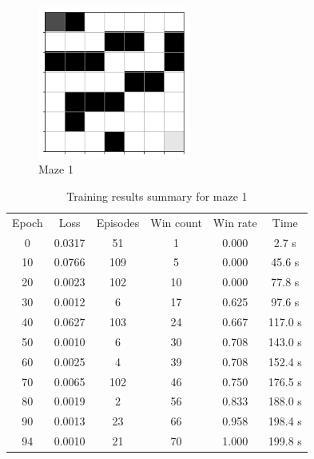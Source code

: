 \documentclass[a4paper]{article}    %
\begin{document}
\begin{figure}[H]
    \centering
    \includegraphics[width=5cm]{maze1-maze}
    \caption{Maze 1}
    \label{fig:maze1}
\end{figure}

\begin{table}[H]
    \begin{center}
        \begin{tabular}{|c|c|c|c|c|c|}
            \cline{1-6}
            \rowcolor{Gray}
            Epoch & Loss & Episodes & Win count & Win rate & Time \\
            \cline{1-6}
             0 & 0.0317 &  51 &  1 & 0.000 &   2.7 s \\
            10 & 0.0766 & 109 &  5 & 0.000 &  45.6 s \\
            20 & 0.0023 & 102 & 10 & 0.000 &  77.8 s \\
            30 & 0.0012 &   6 & 17 & 0.625 &  97.6 s \\
            40 & 0.0627 & 103 & 24 & 0.667 & 117.0 s \\
            50 & 0.0010 &   6 & 30 & 0.708 & 143.0 s \\
            60 & 0.0025 &   4 & 39 & 0.708 & 152.4 s \\
            70 & 0.0065 & 102 & 46 & 0.750 & 176.5 s \\
            80 & 0.0019 &   2 & 56 & 0.833 & 188.0 s \\
            90 & 0.0013 &  23 & 66 & 0.958 & 198.4 s \\
            94 & 0.0010 &  21 & 70 & 1.000 & 199.8 s \\
            \cline{1-6}
        \end{tabular}
    \end{center}
    \caption{Training results summary for maze 1}
    \label{tab:maze1-results}
\end{table}


\end{document}
